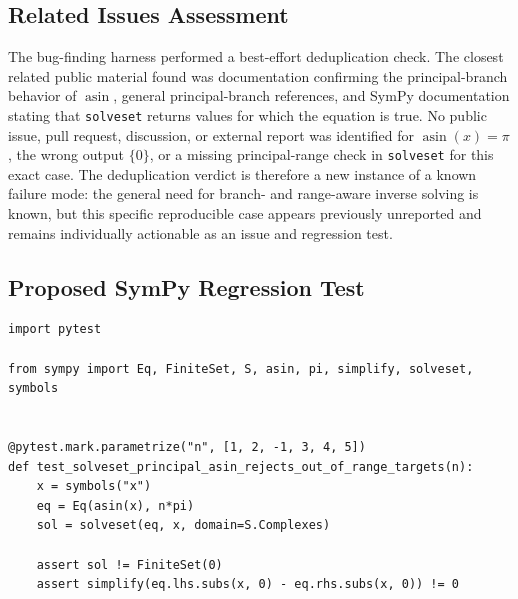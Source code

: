 \documentclass[11pt]{article}
\begin{document}
\subsection{Related Issues Assessment}

The bug-finding harness performed a best-effort deduplication check.  The
closest related public material found was documentation confirming the
principal-branch behavior of \(\operatorname{asin}\), general principal-branch references,
and SymPy documentation stating that \texttt{solveset} returns values for which
the equation is true.  No public issue, pull request, discussion, or external
report was identified for \(\operatorname{asin}(x)=\pi\), the wrong output \(\{0\}\), or a
missing principal-range check in \texttt{solveset} for this exact case.  The
deduplication verdict is therefore a new instance of a known failure mode: the
general need for branch- and range-aware inverse solving is known, but this
specific reproducible case appears previously unreported and remains
individually actionable as an issue and regression test.

\subsection{Proposed SymPy Regression Test}

\medskip

\begin{lstlisting}[style=bugpython]
import pytest

from sympy import Eq, FiniteSet, S, asin, pi, simplify, solveset, symbols


@pytest.mark.parametrize("n", [1, 2, -1, 3, 4, 5])
def test_solveset_principal_asin_rejects_out_of_range_targets(n):
    x = symbols("x")
    eq = Eq(asin(x), n*pi)
    sol = solveset(eq, x, domain=S.Complexes)

    assert sol != FiniteSet(0)
    assert simplify(eq.lhs.subs(x, 0) - eq.rhs.subs(x, 0)) != 0
\end{lstlisting}
\end{document}
